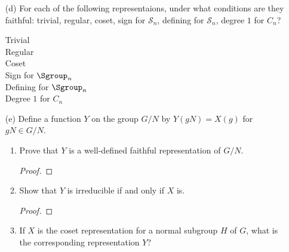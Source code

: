 \documentclass{math174}
\begin{document}
\begin{description}
\begin{enumerate}
  \item[(d)] For each of the following representaions, under what
    conditions are they faithful: trivial, regular, coset, sign for
    \(\mathcal S_n\), defining for \(\mathcal S_n\), degree \(1\) for
    \(C_n\)?

    \begin{solution}
      \begin{description}
      \item[Trivial]
      \item[Regular]
      \item[Coset]
      \item[Sign for \(\Sgroup_n\)]
      \item[Defining for \(\Sgroup_n\)]
      \item[Degree \(1\) for \(C_n\)]
      \end{description}
    \end{solution}

  \item[(e)] Define a function \(Y\) on the group \(G/N\) by
    \(Y(gN) = X(g)\) for \(gN \in G/N\).
    \begin{enumerate}
    \setcounter{enumi}{0}
    \item Prove that \(Y\) is a well-defined faithful representation of
      \(G/N\).

      \begin{solution}
        \begin{proof}

        \end{proof}
      \end{solution}

    \setcounter{enumi}{3}
    \item Show that \(Y\) is irreducible if and only if \(X\) is.

      \begin{solution}
        \begin{proof}

        \end{proof}
      \end{solution}

    \setcounter{enumi}{4}
    \item If \(X\) is the coset representation for a normal subgroup
      \(H\) of \(G\), what is the corresponding representation \(Y\)?

      \begin{solution}

      \end{solution}
    \end{enumerate}
  \end{enumerate}
\end{description}
\end{document}
